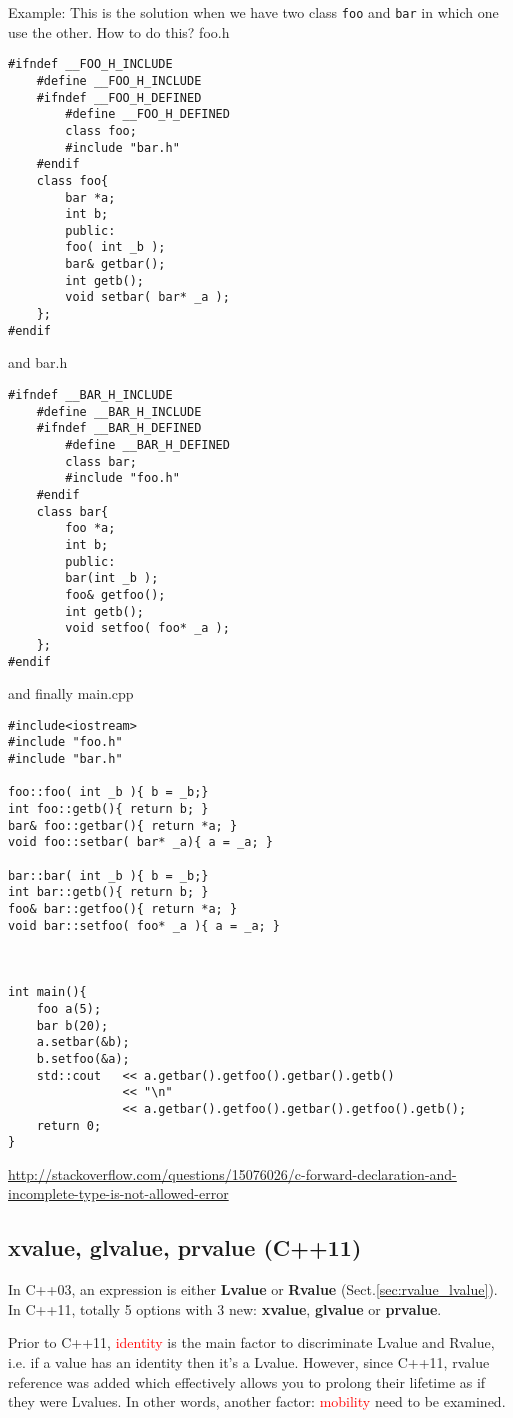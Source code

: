 Example: This is the solution when we have two class \verb!foo! and \verb!bar!
in which one use the other. How to do this? foo.h
\begin{verbatim}
#ifndef __FOO_H_INCLUDE
    #define __FOO_H_INCLUDE
    #ifndef __FOO_H_DEFINED
        #define __FOO_H_DEFINED
        class foo;
        #include "bar.h"
    #endif
    class foo{
        bar *a;
        int b;
        public:
        foo( int _b );
        bar& getbar();
        int getb();
        void setbar( bar* _a );
    };
#endif
\end{verbatim}
and bar.h
\begin{verbatim}
#ifndef __BAR_H_INCLUDE
    #define __BAR_H_INCLUDE
    #ifndef __BAR_H_DEFINED
        #define __BAR_H_DEFINED
        class bar;
        #include "foo.h"
    #endif
    class bar{
        foo *a;
        int b;
        public:
        bar(int _b );
        foo& getfoo();
        int getb();
        void setfoo( foo* _a );
    };
#endif
\end{verbatim}
and finally main.cpp
\begin{verbatim}
#include<iostream>
#include "foo.h"
#include "bar.h"

foo::foo( int _b ){ b = _b;}
int foo::getb(){ return b; }
bar& foo::getbar(){ return *a; }
void foo::setbar( bar* _a){ a = _a; }

bar::bar( int _b ){ b = _b;}
int bar::getb(){ return b; }
foo& bar::getfoo(){ return *a; }
void bar::setfoo( foo* _a ){ a = _a; }



int main(){
    foo a(5);
    bar b(20);
    a.setbar(&b);
    b.setfoo(&a);
    std::cout   << a.getbar().getfoo().getbar().getb() 
                << "\n" 
                << a.getbar().getfoo().getbar().getfoo().getb();
    return 0;
}
\end{verbatim}
\url{http://stackoverflow.com/questions/15076026/c-forward-declaration-and-incomplete-type-is-not-allowed-error}

\subsection{xvalue, glvalue, prvalue (C++11)}
\label{sec:xvalue_glvalue_prvalue}

In C++03, an expression is either {\bf Lvalue} or {\bf Rvalue}
(Sect.\ref{sec:rvalue_lvalue}). In C++11, totally 5 options with 3 new: {\bf
xvalue}, {\bf glvalue} or {\bf prvalue}.

Prior to C++11, \textcolor{red}{identity} is the main factor to discriminate
Lvalue and Rvalue, i.e. if a value has an identity then it's a Lvalue. However,
since C++11, rvalue reference was added which effectively allows you to prolong
their lifetime as if they were Lvalues.
In other words, another factor: \textcolor{red}{mobility} need to be examined.

